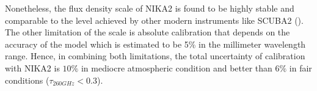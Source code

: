 \documentclass[]{aa} %
\begin{document}
Nonetheless, the flux density scale of NIKA2 is found to be highly stable and comparable to the level achieved by other modern instruments like SCUBA2 (\cite{Dempsey2013}). The other limitation of the scale is absolute calibration that depends on the accuracy of the \cite{moreno2010,Bendo2013} model which is estimated to be 5\% in the millimeter wavelength range. Hence, in combining both limitations, the total uncertainty of calibration with NIKA2 is $10\%$ in mediocre atmospheric condition and better than $6\%$ in fair conditions ($\tau_{260 GHz} <0.3$). %

\end{document}
